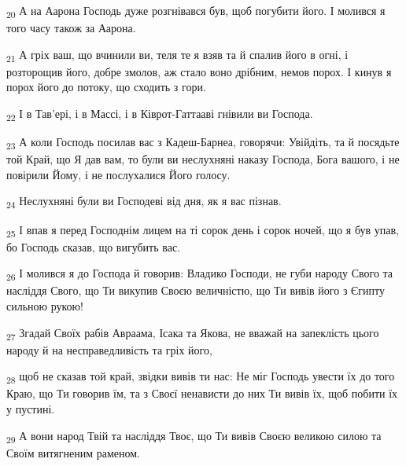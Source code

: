 \begin{tcolorbox}
\textsubscript{20} А на Аарона Господь дуже розгнівався був, щоб погубити його. І молився я того часу також за Аарона.
\end{tcolorbox}
\begin{tcolorbox}
\textsubscript{21} А гріх ваш, що вчинили ви, теля те я взяв та й спалив його в огні, і розторощив його, добре змолов, аж стало воно дрібним, немов порох. І кинув я порох його до потоку, що сходить з гори.
\end{tcolorbox}
\begin{tcolorbox}
\textsubscript{22} І в Тав'ері, і в Массі, і в Ківрот-Гаттааві гнівили ви Господа.
\end{tcolorbox}
\begin{tcolorbox}
\textsubscript{23} А коли Господь посилав вас з Кадеш-Барнеа, говорячи: Увійдіть, та й посядьте той Край, що Я дав вам, то були ви неслухняні наказу Господа, Бога вашого, і не повірили Йому, і не послухалися Його голосу.
\end{tcolorbox}
\begin{tcolorbox}
\textsubscript{24} Неслухняні були ви Господеві від дня, як я вас пізнав.
\end{tcolorbox}
\begin{tcolorbox}
\textsubscript{25} І впав я перед Господнім лицем на ті сорок день і сорок ночей, що я був упав, бо Господь сказав, що вигубить вас.
\end{tcolorbox}
\begin{tcolorbox}
\textsubscript{26} І молився я до Господа й говорив: Владико Господи, не губи народу Свого та насліддя Свого, що Ти викупив Своєю величністю, що Ти вивів його з Єгипту сильною рукою!
\end{tcolorbox}
\begin{tcolorbox}
\textsubscript{27} Згадай Своїх рабів Авраама, Ісака та Якова, не вважай на запеклість цього народу й на несправедливість та гріх його,
\end{tcolorbox}
\begin{tcolorbox}
\textsubscript{28} щоб не сказав той край, звідки вивів ти нас: Не міг Господь увести їх до того Краю, що Ти говорив їм, та з Своєї ненависти до них Ти вивів їх, щоб побити їх у пустині.
\end{tcolorbox}
\begin{tcolorbox}
\textsubscript{29} А вони народ Твій та насліддя Твоє, що Ти вивів Своєю великою силою та Своїм витягненим раменом.
\end{tcolorbox}
